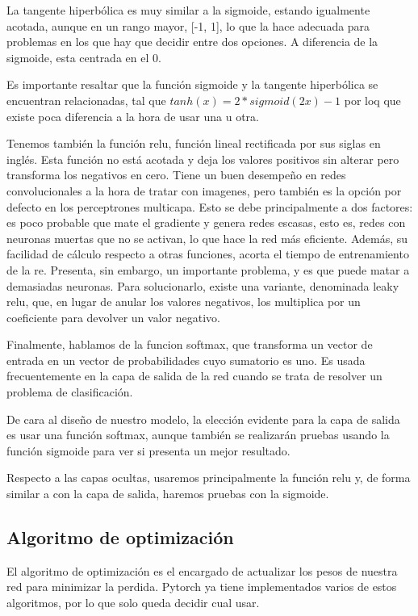La tangente hiperbólica es muy similar a la sigmoide, estando igualmente
acotada, aunque en un rango mayor, {[}-1, 1{]}, lo que la hace adecuada
para problemas en los que hay que decidir entre dos opciones. A
diferencia de la sigmoide, esta centrada en el 0.

Es importante resaltar que la función sigmoide y la tangente hiperbólica
se encuentran relacionadas, tal que \(tanh(x) = 2 * sigmoid(2x) -1\) por
loq que existe poca diferencia a la hora de usar una u otra.

Tenemos también la función relu, función lineal rectificada por sus
siglas en inglés. Esta función no está acotada y deja los valores
positivos sin alterar pero transforma los negativos en cero. Tiene un
buen desempeño en redes convolucionales a la hora de tratar con
imagenes, pero también es la opción por defecto en los perceptrones
multicapa. Esto se debe principalmente a dos factores: es poco probable
que mate el gradiente y genera redes escasas, esto es, redes con
neuronas muertas que no se activan, lo que hace la red más eficiente.
Además, su facilidad de cálculo respecto a otras funciones, acorta el
tiempo de entrenamiento de la re. Presenta, sin embargo, un importante
problema, y es que puede matar a demasiadas neuronas. Para solucionarlo,
existe una variante, denominada leaky relu, que, en lugar de anular los
valores negativos, los multiplica por un coeficiente para devolver un
valor negativo.

Finalmente, hablamos de la funcion softmax, que transforma un vector de
entrada en un vector de probabilidades cuyo sumatorio es uno. Es usada
frecuentemente en la capa de salida de la red cuando se trata de
resolver un problema de clasificación.

De cara al diseño de nuestro modelo, la elección evidente para la capa
de salida es usar una función softmax, aunque también se realizarán
pruebas usando la función sigmoide para ver si presenta un mejor
resultado.

Respecto a las capas ocultas, usaremos principalmente la función relu y,
de forma similar a con la capa de salida, haremos pruebas con la
sigmoide.

\subsection{Algoritmo de optimización}\label{algoritmo-de-optimizacion}

El algoritmo de optimización es el encargado de actualizar los pesos de
nuestra red para minimizar la perdida. Pytorch ya tiene implementados
varios de estos algoritmos, por lo que solo queda decidir cual usar.

